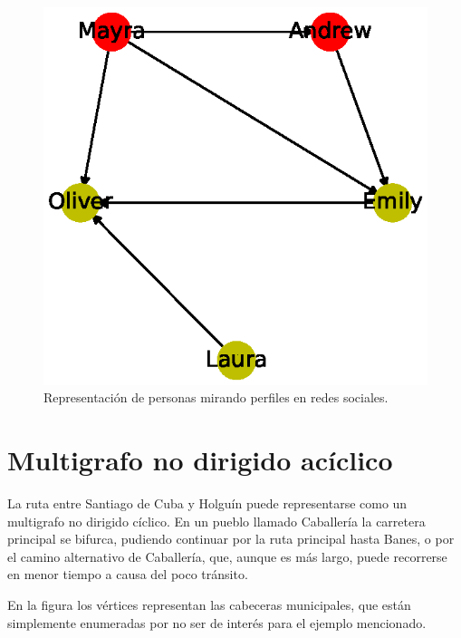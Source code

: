 \documentclass{article}
\begin{document}

\begin{figure}
  \includegraphics[width=.8\columnwidth]{6.eps}
  \caption{Representación de personas mirando perfiles en redes sociales.}
  \label{fig:6}
\end{figure}

\section{Multigrafo no dirigido acíclico}

La ruta entre Santiago de Cuba y Holguín puede representarse  como un multigrafo no dirigido cíclico. En un pueblo llamado Caballería la carretera principal se bifurca, pudiendo continuar por la ruta principal hasta Banes, o por el camino alternativo de Caballería, que, aunque es más largo, puede recorrerse en menor tiempo a causa del poco tránsito.

En la figura los vértices representan las cabeceras municipales, que están simplemente enumeradas por no ser de interés para el ejemplo mencionado.
\end{document}
